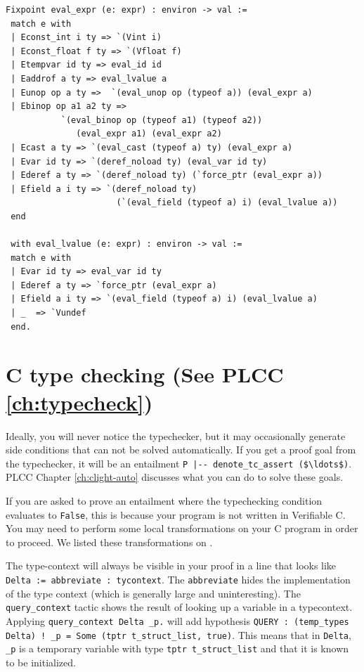 \documentclass[12pt,fleqn,openany,oneside,showtrims]{memoir}
\newcommand{\ychapter}[2]{\chapter[#1]{#1 \hfill \normalsize #2}}
\begin{document}
\clearpage
\begin{lstlisting}
Fixpoint eval_expr (e: expr) : environ -> val :=
 match e with
 | Econst_int i ty => `(Vint i)
 | Econst_float f ty => `(Vfloat f)
 | Etempvar id ty => eval_id id 
 | Eaddrof a ty => eval_lvalue a 
 | Eunop op a ty =>  `(eval_unop op (typeof a)) (eval_expr a) 
 | Ebinop op a1 a2 ty =>  
           `(eval_binop op (typeof a1) (typeof a2))
              (eval_expr a1) (eval_expr a2)
 | Ecast a ty => `(eval_cast (typeof a) ty) (eval_expr a) 
 | Evar id ty => `(deref_noload ty) (eval_var id ty)
 | Ederef a ty => `(deref_noload ty) (`force_ptr (eval_expr a))
 | Efield a i ty => `(deref_noload ty) 
                      (`(eval_field (typeof a) i) (eval_lvalue a))
 end

 with eval_lvalue (e: expr) : environ -> val := 
 match e with 
 | Evar id ty => eval_var id ty
 | Ederef a ty => `force_ptr (eval_expr a)
 | Efield a i ty => `(eval_field (typeof a) i) (eval_lvalue a)
 | _  => `Vundef
 end.
\end{lstlisting}

\ychapter{C type checking}{(See PLCC \autoref{ch:typecheck})}
Ideally, you will never notice the typechecker, but it may occasionally
generate side conditions that can not be solved automatically.
If you get a proof goal from the typechecker, it will be an entailment 
\lstinline!P |-- denote_tc_assert ($\ldots$)!. PLCC Chapter
\autoref{ch:clight-auto} discusses what you can do to solve these goals. 

If you are asked to prove an entailment where the typechecking condition
evaluates to \lstinline|False|, this is because your program is not written in
Verifiable C. You may need to perform some local transformations on your C
program in order to proceed. We listed these transformations on
. 

The type-context will always be visible in your proof in a line that looks like 
\lstinline|Delta := abbreviate : tycontext|. The \lstinline|abbreviate|
hides the implementation of the type context (which is generally large
and uninteresting). The
\lstinline|query_context| tactic shows the result of looking up a variable in
a typecontext. Applying \lstinline|query_context Delta _p.| will add hypothesis
\lstinline|QUERY : (temp_types Delta) ! _p = Some (tptr t_struct_list, true)|.
This means that in \lstinline|Delta|, \lstinline|_p| is a temporary variable
with type \lstinline|tptr t_struct_list| and that it is known to be initialized.
\end{document}

